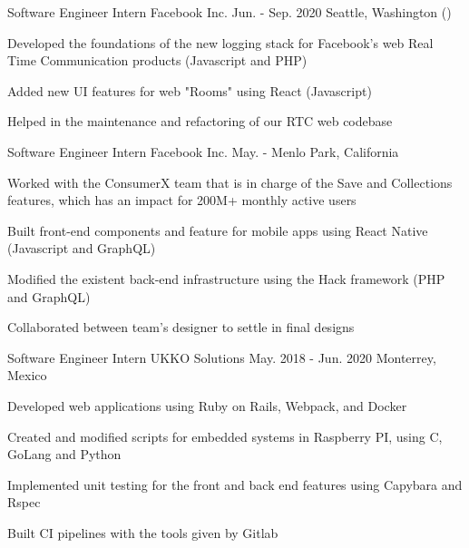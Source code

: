 \begin{cventries}
  \cventry
    {Software Engineer Intern} %
    {Facebook Inc.} %
    {Jun. - Sep. 2020} %
    {Seattle, Washington (\IntlRemote)} %
    {
      \begin{cvitems} %
        \item {Developed the foundations of the new logging stack for Facebook's web Real Time Communication products (Javascript and PHP)}
        \item {Added new UI features for web "Rooms" using React (Javascript)}
        \item {Helped in the maintenance and refactoring of our RTC web codebase}
      \end{cvitems}
    }
  \cventry
    {Software Engineer Intern} %
    {Facebook Inc.} %
    {May. - } %
    {Menlo Park, California} %
    {
      \begin{cvitems} %
        \item {Worked with the ConsumerX team that is in charge of the Save and Collections features, which has an impact for 200M+ monthly active users}
        \item {Built front-end components and feature for mobile apps using React Native (Javascript and GraphQL)}
        \item {Modified the existent back-end infrastructure using the Hack framework (PHP and GraphQL)}
        \item {Collaborated between team's designer to settle in final designs}
      \end{cvitems}
    }
  \cventry
    {Software Engineer Intern} %
    {UKKO Solutions} %
    {May. 2018 - Jun. 2020} %
    {Monterrey, Mexico} %
    {
      \begin{cvitems} %
        \item {Developed web applications using Ruby on Rails, Webpack, and Docker}
        \item {Created and modified scripts for embedded systems in Raspberry PI, using C, GoLang and Python}
        \item {Implemented unit testing for the front and back end features using Capybara and Rspec}
        \item {Built CI pipelines with the tools given by Gitlab}
      \end{cvitems}
    }
\end{cventries}
